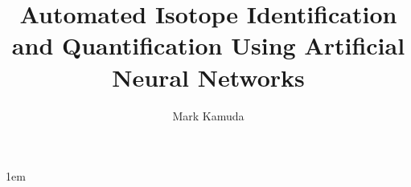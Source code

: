 \documentclass[thesis,tocnosub,noragright,centerchapter,12pt]{uiucecethesis09}
\title{Automated Isotope Identification and Quantification Using Artificial Neural Networks}
\author{Mark Kamuda}
\begin{document}
%

\maketitle
\parindent 1em%
\frontmatter

\begin{abstract}

\end{abstract}



\begin{acknowledgments}

\end{acknowledgments}

\tableofcontents

\listoftables

\listoffigures

\end{document}
